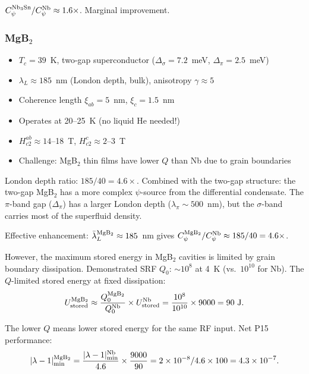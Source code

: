 \documentclass[11pt]{article}
\newcommand{\ee}[1]{\times 10^{#1}}
\newcommand{\lam}{\lambda}
\begin{document}
$C_\psi^{\rm Nb_3Sn}/C_\psi^{\rm Nb} \approx 1.6\times$. Marginal improvement.

\subsubsection{MgB$_2$}

\begin{itemize}
\item $T_c = 39$~K, two-gap superconductor ($\Delta_\sigma = 7.2$~meV, $\Delta_\pi = 2.5$~meV)
\item $\lambda_L \approx 185$~nm (London depth, bulk), anisotropy $\gamma \approx 5$
\item Coherence length $\xi_{ab} = 5$~nm, $\xi_c = 1.5$~nm
\item Operates at 20--25~K (no liquid He needed!)
\item $H_{c2}^{ab} \approx 14$--18~T, $H_{c2}^c \approx 2$--3~T
\item Challenge: MgB$_2$ thin films have lower $Q$ than Nb due to grain boundaries
\end{itemize}

London depth ratio: $185/40 = 4.6\times$. Combined with the two-gap structure:
the two-gap MgB$_2$ has a more complex $\psi$-source from the differential
condensate. The $\pi$-band gap ($\Delta_\pi$) has a larger London depth
($\lambda_\pi \sim 500$~nm), but the $\sigma$-band carries most of the superfluid
density.

Effective enhancement: $\bar{\lambda}_L^{\rm MgB_2} \approx 185$~nm gives
$C_\psi^{\rm MgB_2}/C_\psi^{\rm Nb} \approx 185/40 = 4.6\times$.

However, the maximum stored energy in MgB$_2$ cavities is limited by grain
boundary dissipation. Demonstrated SRF $Q_0$: $\sim 10^8$ at 4~K (vs.\ $10^{10}$
for Nb). The $Q$-limited stored energy at fixed dissipation:
\begin{equation}
U_{\rm stored}^{\rm MgB_2} \approx \frac{Q_0^{\rm MgB_2}}{Q_0^{\rm Nb}}
\times U_{\rm stored}^{\rm Nb} = \frac{10^8}{10^{10}} \times 9000 = 90~{\rm J}.
\end{equation}

The lower $Q$ means lower stored energy for the same RF input. Net P15 performance:
\begin{equation}
|\lam-1|_{\rm min}^{\rm MgB_2} = \frac{|\lam-1|_{\rm min}^{\rm Nb}}{4.6}
\times \frac{9000}{90} = 2\ee{-8}/4.6 \times 100 = 4.3\ee{-7}.
\end{equation}
\end{document}

